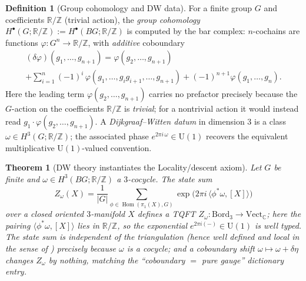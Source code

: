 \documentclass[12pt]{article}
\newtheorem{theorem}{Theorem}[section]
\theoremstyle{definition}
\newtheorem{definition}[definition]{Definition}
\theoremstyle{remark}
\newcommand{\Bord}{\mathrm{Bord}}
\newcommand{\Vect}{\mathrm{Vect}}
\newcommand{\Hom}{\operatorname{Hom}}
\newcommand{\Zm}{\mathbb{Z}}
\newcommand{\Rm}{\mathbb{R}}
\newcommand{\Cm}{\mathbb{C}}
\newcommand{\Umone}{\mathrm{U}(1)}
\begin{document}
\begin{definition}[Group cohomology and DW data]
\label{def:dw-data}
For a finite group $G$ and coefficients $\Rm/\Zm$ (trivial action), the
\emph{group cohomology} $H^\bullet(G;\Rm/\Zm):=H^\bullet(BG;\Rm/\Zm)$ is computed
by the bar complex: $n$-cochains are functions $\varphi\colon G^n\to\Rm/\Zm$, with
\emph{additive} coboundary
\begin{multline*}
  (\delta\varphi)(g_1,\dots,g_{n+1})=\varphi(g_2,\dots,g_{n+1})\\
  +\sum_{i=1}^{n}(-1)^i\,\varphi(g_1,\dots,g_ig_{i+1},\dots,g_{n+1})
  +(-1)^{n+1}\varphi(g_1,\dots,g_n) .
\end{multline*}
Here the leading term $\varphi(g_2,\dots,g_{n+1})$ carries no prefactor precisely
because the $G$-action on the coefficients $\Rm/\Zm$ is \emph{trivial}; for a
nontrivial action it would instead read $g_1\!\cdot\!\varphi(g_2,\dots,g_{n+1})$.
A \emph{Dijkgraaf--Witten datum} in dimension $3$ is a class
$\omega\in H^3(G;\Rm/\Zm)$; the associated phase $e^{2\pi i\,\omega}\in\Umone$
recovers the equivalent multiplicative $\Umone$-valued convention.
\end{definition}

\begin{theorem}[DW theory instantiates the Locality/descent axiom]
\label{thm:dw}
Let $G$ be finite and $\omega\in H^3(BG;\Rm/\Zm)$ a $3$-cocycle. The state sum
\begin{equation}
\label{eq:dw}
  Z_\omega(X)=\frac{1}{|G|}\sum_{\phi\in\Hom(\pi_1(X),G)}
  \exp\!\bigl(2\pi i\,\langle\phi^*\omega,[X]\rangle\bigr)
\end{equation}
over a closed oriented $3$-manifold $X$ defines a TQFT
$Z_\omega\colon\Bord_3\to\Vect_\Cm$; here the pairing
$\langle\phi^*\omega,[X]\rangle$ lies in $\Rm/\Zm$, so the exponential
$e^{2\pi i(-)}\in\Umone$ is well typed. The state sum is independent of the
triangulation (hence well defined and local in the sense of
) precisely because $\omega$ is a cocycle; and a coboundary shift
$\omega\mapsto\omega+\delta\eta$ changes $Z_\omega$ by nothing, matching the
``coboundary $=$ pure gauge'' dictionary entry.
\end{theorem}
\end{document}
